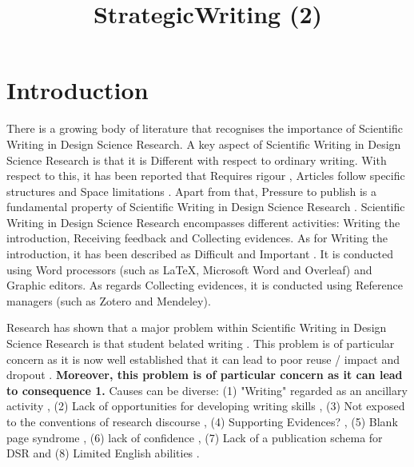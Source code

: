 \documentclass{article}
\title{StrategicWriting (2)}
\author{}
\begin{document}
\maketitle
      

\section{Introduction}

There is a growing body of literature that recognises the importance of Scientific Writing in Design Science Research. A key aspect of Scientific Writing in Design Science Research is that it is Different with respect to ordinary writing. With respect to this, it has been reported that Requires rigour \cite{JohannessonAnIntroduction}, Articles follow specific structures \cite{Turbek2016} \cite{JohannessonAnIntroduction} \cite{psychologicalscience.org} \cite{Kanoksilapatham2012} and Space limitations \cite{Gregor2013} \cite{Hsu2004}. Apart from that, Pressure to publish is a fundamental property of Scientific Writing in Design Science Research \cite{CoylarBecomingwriters} \cite{Turbek2016} \cite{Sorensen1994} \cite{Kanoksilapatham2012} \cite{Mizumoto2017} \cite{Cotterall2011}. Scientific Writing in Design Science Research encompasses different activities: Writing the introduction, Receiving feedback and Collecting evidences. As for Writing the introduction, it has been described as Difficult \cite{Hsu2004} \cite{Hsu2004} \cite{Hsu2004} \cite{PeatScientificWriting.} \cite{Cotterall2011} and Important \cite{Gregor2013} \cite{Turbek2016} \cite{Turbek2016} \cite{SwalesTheWriting} \cite{Khaw2017} \cite{Kanoksilapatham2012}. It is conducted using Word processors (such as LaTeX, Microsoft Word and Overleaf) and Graphic editors. As regards Collecting evidences, it is conducted using Reference managers (such as Zotero and Mendeley). 
    
Research has shown that a major problem within Scientific Writing in Design Science Research is that student belated writing \cite{Wellington2010} \cite{Badley2009} \cite{Turbek2016}. This problem is of particular concern as it is now well established that it can lead to poor reuse / impact and dropout \cite{Wellington2010} \cite{Itua2014}.\textbf{ Moreover, this problem is of particular concern as it can lead to consequence 1. } Causes can be diverse: (1) "Writing" regarded as an ancillary activity \cite{Turbek2016} \cite{Turbek2016}, (2) Lack of opportunities for developing writing skills \cite{Cotterall2011}, (3) Not exposed to the conventions of research discourse \cite{Elton2010} \cite{Badenhorst2015} \cite{Wellington2010} \cite{Cotterall2011} \cite{Itua2014}, (4) Supporting Evidences? \cite{Hsu2004} \cite{Badenhorst2015} \cite{Badenhorst2015} \cite{Cotterall2011} \cite{Itua2014} \cite{Cameron2009} \cite{Lindsay1854}, (5) Blank page syndrome \cite{Lindsay1854} \cite{Sorensen1994} \cite{Wellington2010} \cite{Cameron2009}, (6) lack of confidence \cite{Carter2012}, (7) Lack of a publication schema for DSR \cite{Gregor2013} \cite{Gregor2013} and (8) Limited English abilities \cite{Mizumoto2017} \cite{Cotterall2011} \cite{Anthony2003}. 
    
\end{document}

